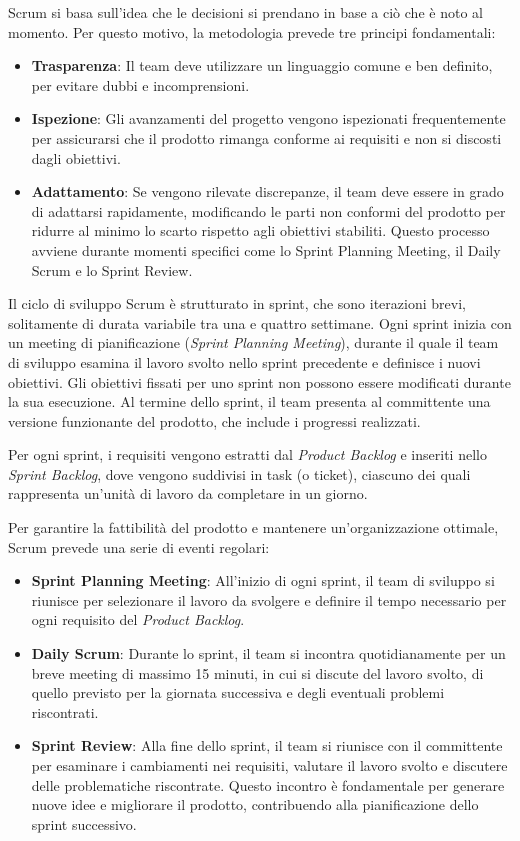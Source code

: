 Scrum si basa sull'idea che le decisioni si prendano in base a ciò che è noto al momento. Per questo motivo, la metodologia prevede tre principi fondamentali:

\begin{itemize}
    \item \textbf{Trasparenza}: Il team deve utilizzare un linguaggio comune e ben definito, per evitare dubbi e incomprensioni.
    \item \textbf{Ispezione}: Gli avanzamenti del progetto vengono ispezionati frequentemente per assicurarsi che il prodotto rimanga conforme ai requisiti e non si discosti dagli obiettivi.
    \item \textbf{Adattamento}: Se vengono rilevate discrepanze, il team deve essere in grado di adattarsi rapidamente, modificando le parti non conformi del prodotto per ridurre al minimo lo scarto rispetto agli obiettivi stabiliti. Questo processo avviene durante momenti specifici come lo Sprint Planning Meeting, il Daily Scrum e lo Sprint Review.
\end{itemize}

Il ciclo di sviluppo Scrum è strutturato in sprint, che sono iterazioni brevi, solitamente di durata variabile tra una e quattro settimane. Ogni sprint inizia con un meeting di pianificazione (\textit{Sprint Planning Meeting}), durante il quale il team di sviluppo esamina il lavoro svolto nello sprint precedente e definisce i nuovi obiettivi. Gli obiettivi fissati per uno sprint non possono essere modificati durante la sua esecuzione. Al termine dello sprint, il team presenta al committente una versione funzionante del prodotto, che include i progressi realizzati.

Per ogni sprint, i requisiti vengono estratti dal \textit{Product Backlog} e inseriti nello \textit{Sprint Backlog}, dove vengono suddivisi in task (o ticket), ciascuno dei quali rappresenta un'unità di lavoro da completare in un giorno.

Per garantire la fattibilità del prodotto e mantenere un'organizzazione ottimale, Scrum prevede una serie di eventi regolari:

\begin{itemize}
    \item \textbf{Sprint Planning Meeting}: All'inizio di ogni sprint, il team di sviluppo si riunisce per selezionare il lavoro da svolgere e definire il tempo necessario per ogni requisito del \textit{Product Backlog}.
    \item \textbf{Daily Scrum}: Durante lo sprint, il team si incontra quotidianamente per un breve meeting di massimo 15 minuti, in cui si discute del lavoro svolto, di quello previsto per la giornata successiva e degli eventuali problemi riscontrati.
    \item \textbf{Sprint Review}: Alla fine dello sprint, il team si riunisce con il committente per esaminare i cambiamenti nei requisiti, valutare il lavoro svolto e discutere delle problematiche riscontrate. Questo incontro è fondamentale per generare nuove idee e migliorare il prodotto, contribuendo alla pianificazione dello sprint successivo.
\end{itemize}

